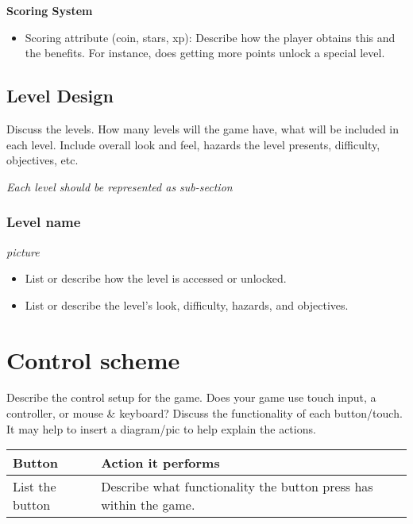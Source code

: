 \documentclass[a4paper, 12pt]{report}
\begin{document}
\textbf{Scoring System}
\begin{itemize}
    \item Scoring attribute (coin, stars, xp): Describe how the player obtains this and the benefits. For instance, does getting more points unlock a special level.
\end{itemize}

\section{Level Design}

Discuss the levels. How many levels will the game have, what will be included in each level. Include overall look and feel, hazards the level presents, difficulty, objectives, etc.

\textit{Each level should be represented as sub-section}

\subsection{Level name}
\textit{picture}

\begin{itemize}
    \item List or describe how the level is accessed or unlocked.
\end{itemize}

\begin{itemize}
    \item List or describe the level’s look, difficulty, hazards, and objectives.
\end{itemize}

\chapter{Control scheme}
Describe the control setup for the game. Does your game use touch input, a controller, or mouse \& keyboard? Discuss the functionality of each button/touch. It may help to insert a diagram/pic to help explain the actions.

\begin{tabular}[h]{p{4 cm}p{7cm}}
    \hline
    Button & Action it performs
     \\
        \hline
         List the button & Describe what functionality the button press has within the game.
     \\
     \hline
\end{tabular}
\vspace{1 cm}
\end{document}
